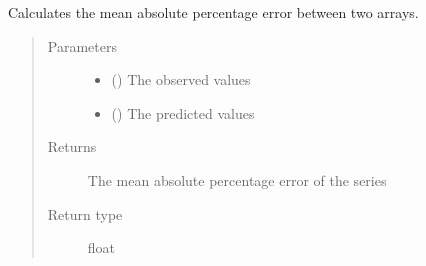 \documentclass[letterpaper,10pt,english]{sphinxmanual}
\begin{document}

\begin{fulllineitems}
\label{\detokenize{index:Forecaster.eval_inspect.mean_absolute_percentage_error}}
Calculates the mean absolute percentage error between two arrays.
\begin{quote}\begin{description}
\item[{Parameters}] \leavevmode\begin{itemize}
\item {} 
 () \textendash{} The observed values

\item {} 
 () \textendash{} The predicted values

\end{itemize}

\item[{Returns}] \leavevmode
The mean absolute percentage error of the series

\item[{Return type}] \leavevmode
float

\end{description}\end{quote}

\end{fulllineitems}

\end{document}
